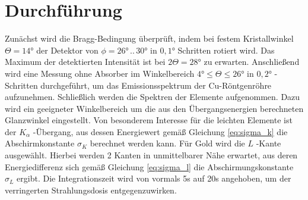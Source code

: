 \section{Durchführung}
\label{sec:Durchführung}

Zunächst wird die Bragg-Bedingung überprüft, indem bei festem Kristallwinkel $\Theta = 14\si{\degree}$ der Detektor von $\phi=26\si{\degree} \, .. \, 30\si{\degree}$ in $0,1\si{\degree}$ Schritten rotiert wird. Das Maximum der detektierten Intensität ist bei $2\Theta = 28\si{\degree}$ zu erwarten. Anschließend wird eine Messung ohne Absorber im Winkelbereich $4\si{\degree} \leq \Theta \leq 26\si{\degree}$ in $0,2\si{\degree}$ -Schritten durchgeführt, um das Emissionsspektrum der Cu-Röntgenröhre aufzunehmen. Schließlich werden die Spektren der Elemente aufgenommen. Dazu wird ein geeigneter Winkelbereich um die aus den Übergangsenergien berechneten Glanzwinkel eingestellt. Von besonderem Interesse für die leichten Elemente ist der $K_\alpha$ -Übergang, aus dessen Energiewert gemäß Gleichung \eqref{eq:sigma_k} die Abschirmkonstante $\sigma_K$ berechnet werden kann. Für Gold wird die $L$ -Kante ausgewählt. Hierbei werden 2 Kanten in unmittelbarer Nähe erwartet, aus deren Energiedifferenz sich gemäß Gleichung \eqref{eq:sigma_l} die Abschirmungskonstante $\sigma_L$ ergibt. Die Integrationszeit wird von vormals 5s auf 20s angehoben, um der verringerten Strahlungsdosis entgegenzuwirken.
